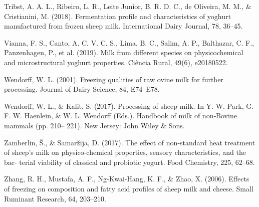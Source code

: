 \documentclass[twocolumn]{ctexart}
\begin{document}
Tribst, A. A. L., Ribeiro, L. R., Leite Junior, B. R. D. C., de Oliveira, M. M., \& Cristianini, M.
(2018). Fermentation profile and characteristics of yoghurt manufactured from
frozen sheep milk. International Dairy Journal, 78, 36–45.

Vianna, F. S., Canto, A. C. V. C. S., Lima, B. C., Salim, A. P., Balthazar, C. F., Panzenhagen,
P., et al. (2019). Milk from different species on physicochemical and microstructural
yoghurt properties. Ciência Rural, 49(6), e20180522.

Wendorff, W. L. (2001). Freezing qualities of raw ovine milk for further processing.
Journal of Dairy Science, 84, E74–E78.

Wendorff, W. L., \& Kalit, S. (2017). Processing of sheep milk. In Y. W. Park, G. F. W.
Haenlein, \& W. L. Wendorff (Eds.). Handbook of milk of non‐Bovine mammals (pp. 210–
221). New Jersey: John Wiley \& Sons.

Zamberlin, Š., \& Samaržija, D. (2017). The effect of non-standard heat treatment of
sheep's milk on physico-chemical properties, sensory characteristics, and the bac-
terial viability of classical and probiotic yogurt. Food Chemistry, 225, 62–68.

Zhang, R. H., Mustafa, A. F., Ng-Kwai-Hang, K. F., \& Zhao, X. (2006). Effects of freezing
on composition and fatty acid profiles of sheep milk and cheese. Small Ruminant
Research, 64, 203–210.
\end{document}
